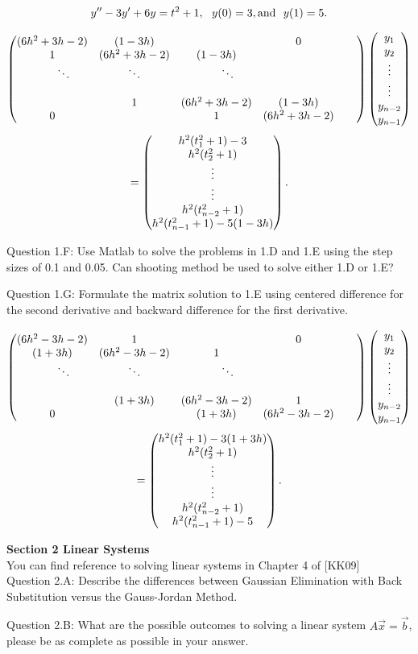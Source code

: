 \documentclass{article}
\renewcommand{\cite}[1]{[#1]}
\def\ds{\displaystyle}
\begin{document}
$$y'' - 3y' + 6y = t^2 + 1, \ \ y(0)=3, {\rm and} \ \ y(1) = 5.$$
\par \noindent
{\color{teal}$$ \begin{pmatrix} (6h^2+3h-2) & (1-3h) &  &  0 \cr 1 & (6h^2+3h-2) & (1-3h) & & & \cr  \ \ \ \ \ \  \ddots & \ddots & \ \ \ \ \ \ \ddots &  & \cr  \cr & 1 & (6h^2+3h-2) &  (1-3h) \cr 0 &  & 1 & (6h^2+3h-2) \end{pmatrix} \begin{pmatrix} y_1 \cr y_2 \cr \vdots \cr \vdots \cr y_{n-2} \cr y_{n-1}\end{pmatrix} $$
$$= \begin{pmatrix} h^2 (t_1^2+1)-3 \cr h^2(t_2^2+1) \cr \vdots \cr \vdots \cr h^2(t_{n-2}^2+1) \cr h^2(t_{n-1}^2+1)-5(1-3h)\end{pmatrix}.$$}
\par \medskip \noindent 
%
Question 1.F: Use Matlab to solve the problems in 1.D and 1.E using the step sizes of 0.1 and 0.05. Can shooting method be used to solve either 1.D or 1.E?
\par \medskip \noindent 
%
Question 1.G: Formulate the matrix solution to 1.E using centered difference for the second derivative and backward difference for the first derivative. 
\par \noindent
{\color{teal}$$ \begin{pmatrix} (6h^2-3h-2) & 1 &  &   0 \cr (1+3h) & (6h^2-3h-2) & 1 & & & \cr  \ \ \ \ \ \  \ddots & \ddots & \ \ \ \ \ \ \ddots &  & \cr  \cr & (1+3h) & (6h^2-3h-2) &  1 \cr 0 &  & (1+3h) & (6h^2-3h-2) \end{pmatrix} \begin{pmatrix} y_1 \cr y_2 \cr \vdots \cr \vdots \cr y_{n-2} \cr y_{n-1}\end{pmatrix} $$
$$= \begin{pmatrix} h^2 (t_1^2+1)-3(1+3h) \cr h^2(t_2^2+1) \cr \vdots \cr \vdots \cr h^2(t_{n-2}^2+1) \cr h^2(t_{n-1}^2+1)-5\end{pmatrix}.$$}
\par \bigskip \par
{\bf Section 2 Linear Systems}  \\
You can find reference to solving linear systems in Chapter 4 of \cite{KK09} \\
%
Question 2.A:  Describe the differences between Gaussian Elimination with Back Substitution versus the Gauss-Jordan Method. 
\par \medskip \noindent 
%
Question 2.B:  What are the possible outcomes to solving a linear system $\ds A\vec x = \vec b$, please be as complete as possible in your answer.
\end{document}
